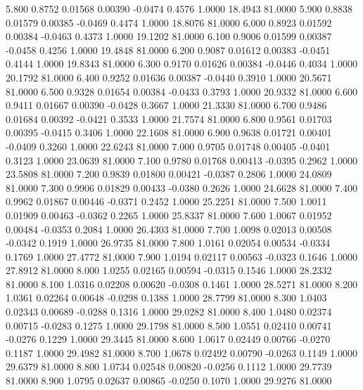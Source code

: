    5.800   0.8752   0.01568   0.00390  -0.0474   0.4576   1.0000  18.4943  81.0000
   5.900   0.8838   0.01579   0.00385  -0.0469   0.4474   1.0000  18.8076  81.0000
   6.000   0.8923   0.01592   0.00384  -0.0463   0.4373   1.0000  19.1202  81.0000
   6.100   0.9006   0.01599   0.00387  -0.0458   0.4256   1.0000  19.4848  81.0000
   6.200   0.9087   0.01612   0.00383  -0.0451   0.4144   1.0000  19.8343  81.0000
   6.300   0.9170   0.01626   0.00384  -0.0446   0.4034   1.0000  20.1792  81.0000
   6.400   0.9252   0.01636   0.00387  -0.0440   0.3910   1.0000  20.5671  81.0000
   6.500   0.9328   0.01654   0.00384  -0.0433   0.3793   1.0000  20.9332  81.0000
   6.600   0.9411   0.01667   0.00390  -0.0428   0.3667   1.0000  21.3330  81.0000
   6.700   0.9486   0.01684   0.00392  -0.0421   0.3533   1.0000  21.7574  81.0000
   6.800   0.9561   0.01703   0.00395  -0.0415   0.3406   1.0000  22.1608  81.0000
   6.900   0.9638   0.01721   0.00401  -0.0409   0.3260   1.0000  22.6243  81.0000
   7.000   0.9705   0.01748   0.00405  -0.0401   0.3123   1.0000  23.0639  81.0000
   7.100   0.9780   0.01768   0.00413  -0.0395   0.2962   1.0000  23.5808  81.0000
   7.200   0.9839   0.01800   0.00421  -0.0387   0.2806   1.0000  24.0809  81.0000
   7.300   0.9906   0.01829   0.00433  -0.0380   0.2626   1.0000  24.6628  81.0000
   7.400   0.9962   0.01867   0.00446  -0.0371   0.2452   1.0000  25.2251  81.0000
   7.500   1.0011   0.01909   0.00463  -0.0362   0.2265   1.0000  25.8337  81.0000
   7.600   1.0067   0.01952   0.00484  -0.0353   0.2084   1.0000  26.4303  81.0000
   7.700   1.0098   0.02013   0.00508  -0.0342   0.1919   1.0000  26.9735  81.0000
   7.800   1.0161   0.02054   0.00534  -0.0334   0.1769   1.0000  27.4772  81.0000
   7.900   1.0194   0.02117   0.00563  -0.0323   0.1646   1.0000  27.8912  81.0000
   8.000   1.0255   0.02165   0.00594  -0.0315   0.1546   1.0000  28.2332  81.0000
   8.100   1.0316   0.02208   0.00620  -0.0308   0.1461   1.0000  28.5271  81.0000
   8.200   1.0361   0.02264   0.00648  -0.0298   0.1388   1.0000  28.7799  81.0000
   8.300   1.0403   0.02343   0.00689  -0.0288   0.1316   1.0000  29.0282  81.0000
   8.400   1.0480   0.02374   0.00715  -0.0283   0.1275   1.0000  29.1798  81.0000
   8.500   1.0551   0.02410   0.00741  -0.0276   0.1229   1.0000  29.3445  81.0000
   8.600   1.0617   0.02449   0.00766  -0.0270   0.1187   1.0000  29.4982  81.0000
   8.700   1.0678   0.02492   0.00790  -0.0263   0.1149   1.0000  29.6379  81.0000
   8.800   1.0734   0.02548   0.00820  -0.0256   0.1112   1.0000  29.7739  81.0000
   8.900   1.0795   0.02637   0.00865  -0.0250   0.1070   1.0000  29.9276  81.0000
